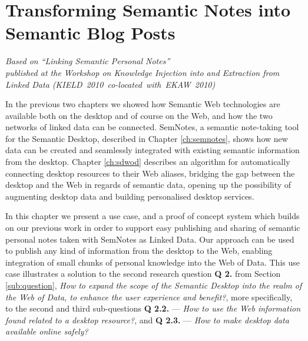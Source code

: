 \chapter{Transforming Semantic Notes into Semantic Blog Posts}
\label{ch:semblogging}

\begin{flushright}
 \textit{Based on ``Linking Semantic Personal Notes'' \cite{Dragan2010a}\\published at the Workshop on Knowledge Injection into and Extraction from Linked Data (KIELD~2010~co-located~with~EKAW~2010)}
\end{flushright}

In the previous two chapters we showed how Semantic Web technologies are available both on the desktop and of course on the Web, and how the two networks of linked data can be connected. SemNotes, a semantic note-taking tool for the Semantic Desktop, described in Chapter \ref{ch:semnotes}, shows how new data can be created and seamlessly integrated with existing semantic information from the desktop. Chapter \ref{ch:sdwod} describes an algorithm for automatically connecting desktop resources to their Web aliases, bridging the gap between the desktop and the Web in regards of semantic data, opening up the possibility of augmenting desktop data and building personalised desktop services. 

In this chapter we present a use case, and a proof of concept system which builds on our previous work in order to support easy publishing and sharing of semantic personal notes taken with SemNotes as Linked Data.
Our approach can be used to publish any kind of information from the desktop to the Web, enabling integration of small chunks of personal knowledge into the Web of Data.
This use case illustrates a solution to the second research question \textbf{Q 2.} from Section \ref{sub:question}, \emph{How to expand the scope of the Semantic Desktop into the realm of the Web of Data, to enhance the user experience and benefit?}, more specifically, to the second and third sub-questions \textbf{Q 2.2.} --- \emph{How to use the Web information found related to a desktop resource?}, and \textbf{Q 2.3.} --- \emph{How to make desktop data available online safely?}









